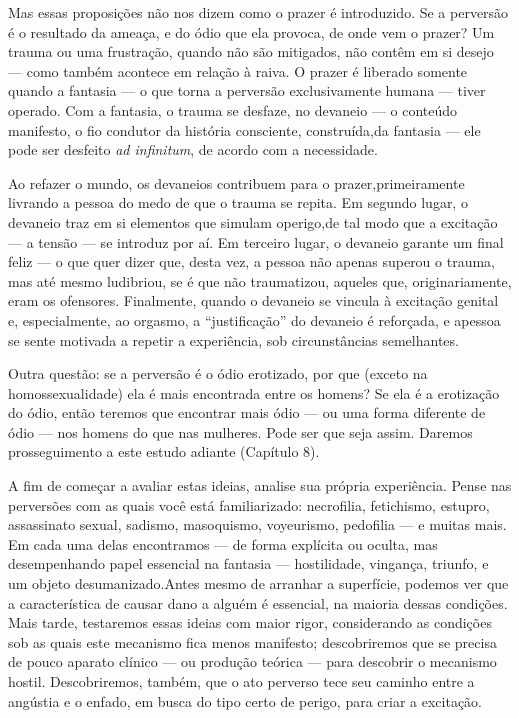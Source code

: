 Mas essas proposições não nos dizem como o prazer é introduzido. Se
a perversão é o resultado da ameaça, e do ódio que ela provoca, de onde
vem o prazer? Um trauma ou uma frustração, quando não são mitigados,
não contêm em si desejo --- como também acontece em relação à raiva. O
prazer é liberado somente quando a fantasia --- o que torna a perversão
exclusivamente humana --- tiver operado. Com a fantasia, o trauma se
desfaz\idxtraumadesf[|(] e, no devaneio --- o conteúdo manifesto, o fio condutor da
história consciente, construída,\idxfantacons[|)] da fantasia --- ele pode ser
desfeito \textit{ad infinitum}, de acordo com a necessidade.

Ao refazer o mundo, os devaneios contribuem para o prazer,\idxfantapraz[|)]
primeiramente livrando a pessoa do medo de que o trauma se repita. Em
segundo lugar, o devaneio traz em si elementos que simulam o\idxpervexpos[|)] perigo,\idxfantaexpo[|)] de
tal modo que a excitação --- a tensão --- se introduz por aí. Em terceiro
lugar, o devaneio garante um final feliz --- o que quer dizer que,
desta vez, a pessoa não apenas superou o trauma, mas até mesmo
ludibriou, se é que não traumatizou, aqueles que, originariamente, eram
os ofensores. Finalmente, quando o devaneio se vincula à excitação
genital e, especialmente, ao orgasmo, a
``justificação'' do devaneio é reforçada, e a\idxpraz[|)]
pessoa se sente\idxtraumanece{} motivada a repetir\idxpervrepet{} a experiência, sob circunstâncias
semelhantes.\idxtraumadesf[|)]

Outra questão: se a perversão é o ódio erotizado, por que (exceto na
homossexualidade) ela é mais encontrada entre os homens?\idxpervpredo{} Se ela
é a erotização do ódio, então teremos que encontrar mais ódio --- ou uma
forma diferente de ódio --- nos homens do que nas mulheres. Pode ser que
seja assim. Daremos prosseguimento a este estudo adiante (Capítulo 8).

A fim de começar a avaliar estas ideias, analise sua própria
experiência.\idxinfan{} Pense nas perversões com as quais você está familiarizado:
necrofilia,\idxnecro{} fetichismo,\idxfetic{} estupro,\idxestup{} assassinato sexual,\idxassas{} sadismo,\idxsadi{}
masoquismo,\idxmasoq{} voyeurismo,\idxvoy{} pedofilia\idxpedof{} --- e muitas mais. Em cada uma delas
encontramos --- de forma explícita ou oculta, mas desempenhando papel
essencial na fantasia --- hostilidade,\idxhost{} vingança, triunfo, e um objeto
desumanizado.\idxdesufant[|)] Antes mesmo de arranhar a superfície, podemos ver que a
característica de causar dano a alguém é essencial, na maioria dessas
condições. Mais tarde, testaremos essas ideias com maior rigor,
considerando as condições sob as quais este mecanismo fica menos
manifesto; descobriremos que se precisa de pouco aparato clínico --- ou
produção teórica --- para descobrir o mecanismo hostil. Descobriremos,
também, que o ato perverso tece seu caminho entre a angústia e o\idxpervenfad{}
enfado,\idxenfa{} em busca do tipo certo de perigo, para criar a excitação.

